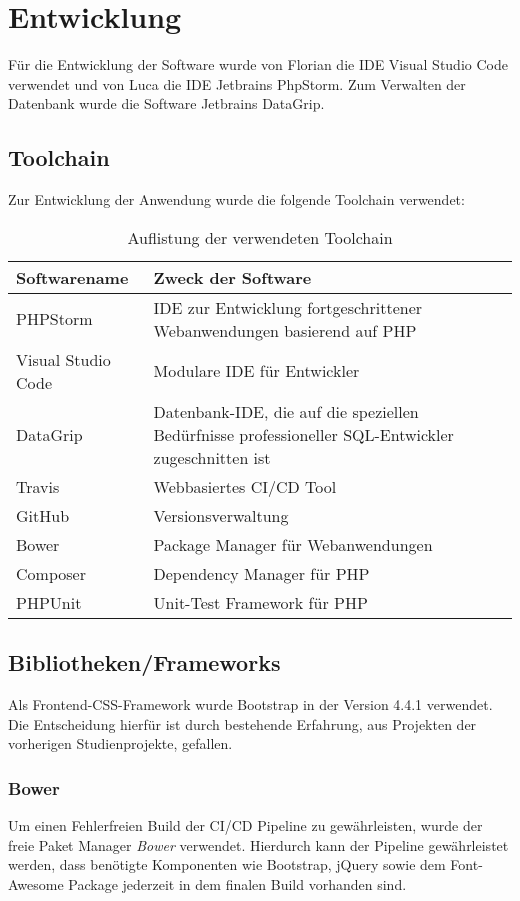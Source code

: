 \chapter{Entwicklung}\label{ch:entwicklung}
Für die Entwicklung der Software wurde von Florian die IDE Visual Studio Code verwendet und von Luca die IDE Jetbrains PhpStorm.
Zum Verwalten der Datenbank wurde die Software Jetbrains DataGrip.

\section{Toolchain}\label{sec:toolchain}
Zur Entwicklung der Anwendung wurde die folgende Toolchain verwendet:

\begin{table}[htb]
\centering
\begin{tabular}{p{5cm}  p{9cm}}
\hline
\textbf{Softwarename} & \textbf{Zweck der Software}\\
\hline
PHPStorm & IDE zur Entwicklung fortgeschrittener Webanwendungen basierend auf PHP\\
\hline
Visual Studio Code & Modulare IDE für Entwickler\\ 
\hline
DataGrip & Datenbank-IDE, die auf die speziellen Bedürfnisse professioneller SQL-Entwickler zugeschnitten ist\\
\hline
Travis & Webbasiertes CI/CD Tool\\
\hline
GitHub & Versionsverwaltung\\
\hline
Bower & Package Manager für Webanwendungen\\
\hline
Composer & Dependency Manager für PHP \\
\hline
PHPUnit & Unit-Test Framework für PHP \\ 
\hline
\end{tabular}
\caption{Auflistung der verwendeten Toolchain}
\end{table}

\section{Bibliotheken/Frameworks}\label{sec:bibliotheken/frameworks}
Als Frontend-CSS-Framework wurde Bootstrap in der Version 4.4.1 verwendet. Die Entscheidung hierfür ist durch bestehende Erfahrung, aus Projekten der vorherigen Studienprojekte, gefallen.
\subsection{Bower}\label{subsec:bower}
Um einen Fehlerfreien Build der CI/CD Pipeline zu gewährleisten, wurde der freie Paket Manager \emph{Bower} verwendet. Hierdurch kann der Pipeline gewährleistet werden, dass benötigte Komponenten wie Bootstrap, jQuery sowie dem Font-Awesome Package jederzeit in dem finalen Build vorhanden sind.
